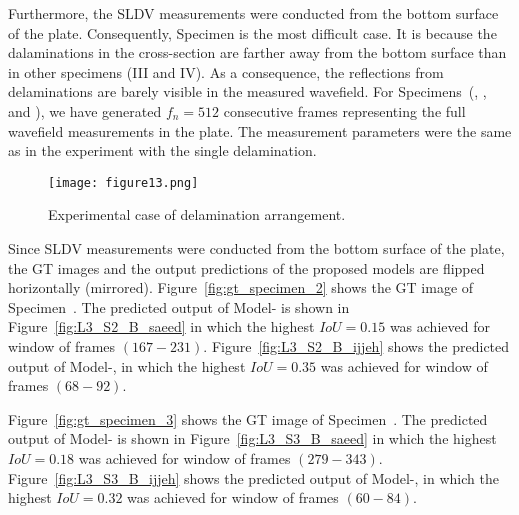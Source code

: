 Furthermore, the SLDV measurements were conducted from the bottom surface of the plate. 
Consequently, Specimen  is the most difficult case.
It is because the dalaminations in the cross-section are farther away from the bottom surface than in other specimens (III and IV).
As a consequence, the reflections from delaminations are barely visible in the measured wavefield.
For Specimens~(, , and ),  we have generated \(f_n=512\) consecutive frames representing the full wavefield measurements in the plate.
The measurement parameters were the same as in the experiment with the single delamination.
\begin{figure}[!h]
	\centering
	\texttt{[image: figure13.png]}
	\caption{Experimental case of delamination arrangement.}
	\label{fig:plate_delam_arrangment}
\end{figure}

Since SLDV measurements were conducted from the bottom surface of the plate, the GT images and the output predictions of the proposed models are flipped horizontally (mirrored).
Figure~\ref{fig:gt_specimen_2} shows the GT image of Specimen~.
The predicted output of Model- is shown in 
Figure~\ref{fig:L3_S2_B_saeed} in which the highest \(IoU=0.15\) was achieved 
for window of frames \((167-231)\).
Figure~\ref{fig:L3_S2_B_ijjeh} shows the predicted output of Model-, in which the highest \(IoU=0.35\) was achieved for window of frames \((68-92)\).

Figure~\ref{fig:gt_specimen_3} shows the GT image of Specimen~.
The predicted output of Model- is shown in 
Figure~\ref{fig:L3_S3_B_saeed} in which the highest \(IoU=0.18\) was achieved 
for window of frames \((279-343)\).
Figure~\ref{fig:L3_S3_B_ijjeh} shows the predicted output of Model-, in which the highest \(IoU=0.32\) was achieved for window of frames \((60-84)\).


